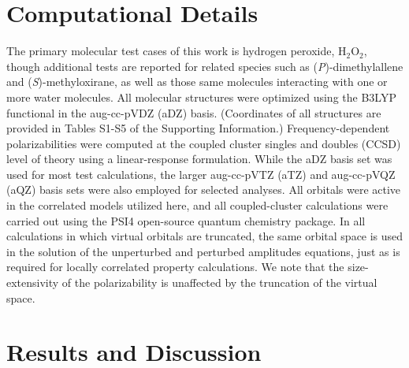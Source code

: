 \section{Computational Details}

The primary molecular test cases of this work is hydrogen peroxide,
H$_2$O$_2$, though additional tests are reported for related species such as
(\textit{P})-dimethylallene and (\textit{S})-methyloxirane, as well as those
same molecules interacting with one or more water molecules.  All molecular
structures were optimized using the B3LYP
functional\cite{Becke93,Stephens94:B3LYP,Lee88:LYP} in the aug-cc-pVDZ (aDZ)
basis.\cite{Dunning89,Kendall92,Woon94} (Coordinates of all structures are
provided in Tables S1-S5 of the Supporting Information.) Frequency-dependent
polarizabilities were computed at the coupled cluster singles and doubles
(CCSD) level of theory\cite{Purvis82} using a linear-response
formulation.\cite{Christiansen98} While the aDZ basis set was used for most
test calculations, the larger aug-cc-pVTZ (aTZ) and aug-cc-pVQZ (aQZ) basis
sets were also employed for selected analyses.\cite{Kendall92} All orbitals
were active in the correlated models utilized here, and all coupled-cluster
calculations were carried out using the PSI4 open-source quantum chemistry
package.\cite{psi4}  In all calculations in which virtual orbitals are
truncated, the same orbital space is used in the solution of the unperturbed
and perturbed amplitudes equations, just as is required for locally correlated
property calculations.\cite{Crawford10}  We note that the size-extensivity of
the polarizability is unaffected by the truncation of
the virtual space.

\section{Results and Discussion}

